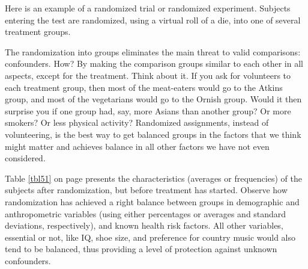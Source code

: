 \documentclass[11pt, chapterprefix=true]{scrbook}\usepackage[]{graphicx}\usepackage[]{color}
\begin{document}
Here is an example of a randomized trial or randomized experiment.   Subjects entering the test are randomized, using a virtual roll of a die, into one of several treatment groups.

The randomization into groups eliminates the main threat to valid comparisons: confounders.  How?  By making the comparison groups similar to each other in all aspects, except for the treatment.  Think about it.  If you ask for volunteers to each treatment group, then most of the meat-eaters would go to the Atkins group, and most of the vegetarians would go to the Ornish group.   Would it then surprise you if one group had, say, more Asians than another group?  Or more smokers?  Or less physical activity?  Randomized assignments, instead of volunteering, is the best way to get balanced groups in the factors that we think might matter and achieves balance in all other factors we have not even considered.

Table \ref{tbl51} on page \pageref{tbl51} presents the characteristics (averages or frequencies) of the subjects after randomization, but before treatment has started.  Observe how randomization has achieved a right balance between groups in demographic and anthropometric variables (using either percentages or averages and standard deviations, respectively), and known health risk factors.  All other variables, essential or not, like IQ, shoe size, and preference for country music would also tend to be balanced, thus providing a level of protection against unknown confounders.

\end{document}
